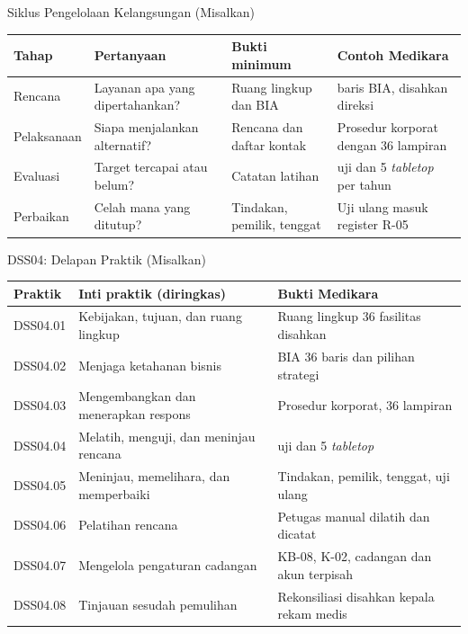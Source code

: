 \documentclass[aspectratio=169, table, 12pt]{beamer}
\begin{document}
\begin{frame}{{\Large Siklus Pengelolaan Kelangsungan (Misalkan)}}
  \vspace{4pt}
  \footnotesize
  \begin{tabularx}{\textwidth}{|>{\raggedright\arraybackslash}p{}|>{\raggedright\arraybackslash}X|>{\raggedright\arraybackslash}X|>{\raggedright\arraybackslash}X|}
    \hline
    \textbf{Tahap} & \textbf{Pertanyaan} & \textbf{Bukti minimum} & \textbf{Contoh Medikara} \\
    \hline
    Rencana & Layanan apa yang dipertahankan? & Ruang lingkup dan BIA & 36 baris BIA, disahkan
    direksi \\ \hline
    Pelaksanaan & Siapa menjalankan alternatif? & Rencana dan daftar kontak & Prosedur korporat
    dengan 36 lampiran \\ \hline
    Evaluasi & Target tercapai atau belum? & Catatan latihan & 144 uji dan 5 \textit{tabletop} per
    tahun \\ \hline
    Perbaikan & Celah mana yang ditutup? & Tindakan, pemilik, tenggat & Uji ulang masuk register
    R-05 \\ \hline
  \end{tabularx}
\end{frame}

\begin{frame}{{\Large DSS04: Delapan Praktik (Misalkan)}}
  \vspace{2pt}
  \scriptsize
  \begin{tabularx}{\textwidth}{|>{\raggedright\arraybackslash}p{}|>{\raggedright\arraybackslash}X|>{\raggedright\arraybackslash}X|}
    \hline
    \textbf{Praktik} & \textbf{Inti praktik (diringkas)} & \textbf{Bukti Medikara} \\ \hline
    DSS04.01 & Kebijakan, tujuan, dan ruang lingkup & Ruang lingkup 36 fasilitas disahkan \\ \hline
    DSS04.02 & Menjaga ketahanan bisnis & BIA 36 baris dan pilihan strategi \\ \hline
    DSS04.03 & Mengembangkan dan menerapkan respons & Prosedur korporat, 36 lampiran \\ \hline
    DSS04.04 & Melatih, menguji, dan meninjau rencana & 144 uji dan 5 \textit{tabletop} \\ \hline
    DSS04.05 & Meninjau, memelihara, dan memperbaiki & Tindakan, pemilik, tenggat, uji ulang \\
    \hline
    DSS04.06 & Pelatihan rencana & Petugas manual dilatih dan dicatat \\ \hline
    DSS04.07 & Mengelola pengaturan cadangan & KB-08, K-02, cadangan dan akun terpisah \\ \hline
    DSS04.08 & Tinjauan sesudah pemulihan & Rekonsiliasi disahkan kepala rekam medis \\ \hline
  \end{tabularx}
\end{frame}
\end{document}
